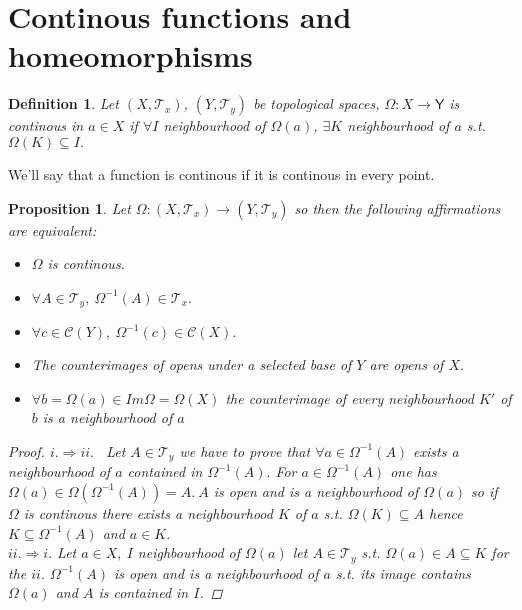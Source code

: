 \documentclass{article}
\newtheorem{proposition}{Proposition}
\newtheorem{definition}{Definition}
\begin{document}
    \section*{Continous functions and homeomorphisms}
    \begin{definition}
        Let $(X, \mathcal{T}_x)$, $(Y, \mathcal{T}_y)$ be topological spaces, $\varOmega : X \rightarrow \mathsf{Y}$ is continous in $a\in X$ if $\forall I $ neighbourhood of $\varOmega(a)$, $\exists K$ neighbourhood of $a$ s.t. $\varOmega(K) \subseteq I.$  
    \end{definition}
    We'll say that a function is continous if it is continous in every point.
    \begin{proposition}
        Let $\varOmega:(X, \mathcal{T}_x) \rightarrow (Y, \mathcal{T}_y)$ so then the following affirmations are equivalent:
        \begin{itemize}
            \item[i.] $\varOmega$ is continous.
            \item[ii.] $\forall A \in \mathcal{T}_y,\ \varOmega^{-1}(A) \in \mathcal{T}_x.$
            \item[iii.] $\forall c \in \mathcal{C}(Y), \ \varOmega^{-1}(c) \in \mathcal{C}(X).$
            \item[iv.] The counterimages of opens under a selected base of $Y$ are opens of $X.$
            \item[v.] $\forall b = \varOmega(a) \in Im\varOmega = \varOmega(X)$ the counterimage  of every neighbourhood $K'$ of $b$ is a neighbourhood of $a$      
        \end{itemize}
        \begin{proof}
            $i. \Rightarrow ii.$ \ Let $A \in \mathcal{T}_y$ we have to prove that $\forall a \in \varOmega^{-1}(A)$ exists a neighbourhood of $a$ contained in $\varOmega^{-1}(A).$ For $a \in \varOmega^{-1}(A)$ one has $\varOmega(a) \in \varOmega(\varOmega^{-1}(A)) = A.\ A$ is open and is a neighbourhood of $\varOmega(a)$ so if $\varOmega$ is continous there exists a neighbourhood $K$ of $a$ s.t. 
            $\varOmega(K) \subseteq A$ hence $K \subseteq \varOmega^{-1}(A)$ and $a \in K.$ \\
            $ii. \Rightarrow i.$ Let $a \in X, \ I$ neighbourhood of $\varOmega(a)$ let $A \in \mathcal{T}_y$ s.t. $\varOmega(a) \in A \subseteq K$ for the $ii.$ $\varOmega^{-1}(A)$ is open and is a neighbourhood of $a$ s.t. its image contains $\varOmega(a)$ and $A$ is contained in $I$.
        \end{proof}
    \end{proposition}
\end{document}
